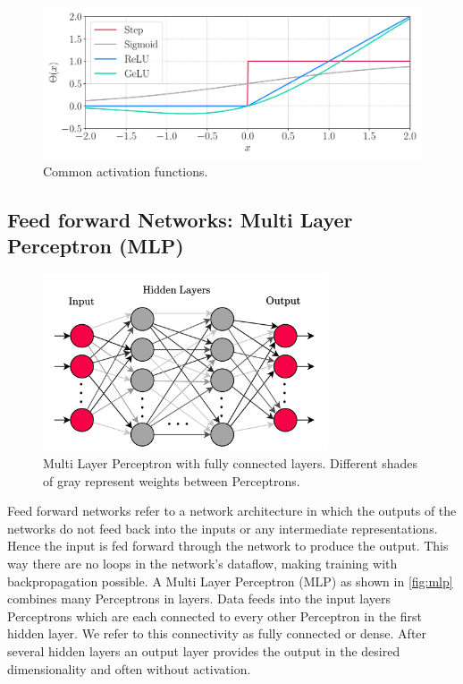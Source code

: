 \begin{figure}[H]
    \centering
    \includegraphics[width=\textwidth]{../fig/background/activation_functions.pdf}
    \caption[Common activation functions]{Common activation functions.}
    \label{fig:activation_functions}
\end{figure}
\subsection{Feed forward Networks: Multi Layer Perceptron (MLP)}
\label{subsec:background_mlp}
\begin{figure}[H]
    \centering
    \includegraphics[width=0.75\textwidth]{../fig/background/MLP.pdf}
    \caption[Multi Layer Perceptron]{Multi Layer Perceptron with fully connected layers. Different shades of gray represent weights between Perceptrons.}
    \label{fig:mlp}
\end{figure}
Feed forward networks refer to a network architecture in which the outputs of the networks do not feed back into the inputs or any intermediate representations. Hence the input is fed forward through the network to produce the output. This way there are no loops in the network's dataflow, making training with backpropagation possible. A Multi Layer Perceptron (MLP) as shown in \autoref{fig:mlp} combines many Perceptrons in layers. Data feeds into the input layers Perceptrons which are each connected to every other Perceptron in the first hidden layer. We refer to this connectivity as fully connected or dense. After several hidden layers an output layer provides the output in the desired dimensionality and often without activation. \\

